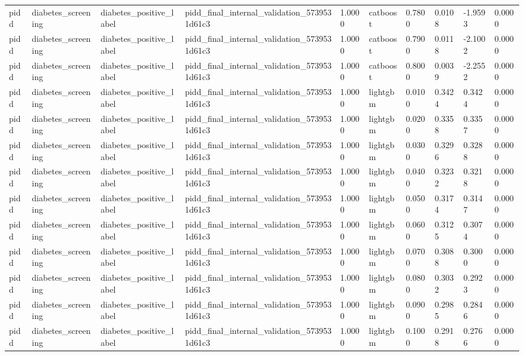 \begin{tabular}{llllllllll}
pidd & diabetes\_screening & diabetes\_positive\_label & pidd\_final\_internal\_validation\_5739531d61c3 & 1.0000 & catboost & 0.7800 & 0.0108 & -1.9593 & 0.0000 \\
pidd & diabetes\_screening & diabetes\_positive\_label & pidd\_final\_internal\_validation\_5739531d61c3 & 1.0000 & catboost & 0.7900 & 0.0118 & -2.1002 & 0.0000 \\
pidd & diabetes\_screening & diabetes\_positive\_label & pidd\_final\_internal\_validation\_5739531d61c3 & 1.0000 & catboost & 0.8000 & 0.0039 & -2.2552 & 0.0000 \\
pidd & diabetes\_screening & diabetes\_positive\_label & pidd\_final\_internal\_validation\_5739531d61c3 & 1.0000 & lightgbm & 0.0100 & 0.3424 & 0.3424 & 0.0000 \\
pidd & diabetes\_screening & diabetes\_positive\_label & pidd\_final\_internal\_validation\_5739531d61c3 & 1.0000 & lightgbm & 0.0200 & 0.3358 & 0.3357 & 0.0000 \\
pidd & diabetes\_screening & diabetes\_positive\_label & pidd\_final\_internal\_validation\_5739531d61c3 & 1.0000 & lightgbm & 0.0300 & 0.3296 & 0.3288 & 0.0000 \\
pidd & diabetes\_screening & diabetes\_positive\_label & pidd\_final\_internal\_validation\_5739531d61c3 & 1.0000 & lightgbm & 0.0400 & 0.3232 & 0.3218 & 0.0000 \\
pidd & diabetes\_screening & diabetes\_positive\_label & pidd\_final\_internal\_validation\_5739531d61c3 & 1.0000 & lightgbm & 0.0500 & 0.3174 & 0.3147 & 0.0000 \\
pidd & diabetes\_screening & diabetes\_positive\_label & pidd\_final\_internal\_validation\_5739531d61c3 & 1.0000 & lightgbm & 0.0600 & 0.3125 & 0.3074 & 0.0000 \\
pidd & diabetes\_screening & diabetes\_positive\_label & pidd\_final\_internal\_validation\_5739531d61c3 & 1.0000 & lightgbm & 0.0700 & 0.3088 & 0.3000 & 0.0000 \\
pidd & diabetes\_screening & diabetes\_positive\_label & pidd\_final\_internal\_validation\_5739531d61c3 & 1.0000 & lightgbm & 0.0800 & 0.3032 & 0.2923 & 0.0000 \\
pidd & diabetes\_screening & diabetes\_positive\_label & pidd\_final\_internal\_validation\_5739531d61c3 & 1.0000 & lightgbm & 0.0900 & 0.2985 & 0.2846 & 0.0000 \\
pidd & diabetes\_screening & diabetes\_positive\_label & pidd\_final\_internal\_validation\_5739531d61c3 & 1.0000 & lightgbm & 0.1000 & 0.2918 & 0.2766 & 0.0000 \\

\end{tabular}
